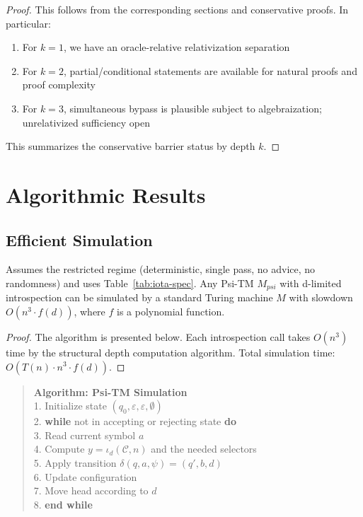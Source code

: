 \begin{proof}
This follows from the corresponding sections and conservative proofs. In particular:

\begin{enumerate}
\item For $k = 1$, we have an oracle-relative relativization separation
\item For $k = 2$, partial/conditional statements are available for natural proofs and proof complexity
\item For $k = 3$, simultaneous bypass is plausible subject to algebraization; unrelativized sufficiency open
\end{enumerate}

This summarizes the conservative barrier status by depth $k$.
\end{proof}

\section{Algorithmic Results}

\subsection{Efficient Simulation}

\begin{theorem}
Assumes the restricted regime (deterministic, single pass, no advice, no randomness) and uses Table~\ref{tab:iota-spec}.
Any Psi-TM $M_{psi}$ with d-limited introspection can be simulated by a standard Turing machine $M$ with slowdown $O(n^3 \cdot f(d))$, where $f$ is a polynomial function.
\end{theorem}

\begin{proof}
The algorithm is presented below. Each introspection call takes $O(n^3)$ time by the structural depth computation algorithm. Total simulation time: $O(T(n) \cdot n^3 \cdot f(d))$.
\end{proof}

\begin{quote}
\textbf{Algorithm: Psi-TM Simulation}\\[0.5em]
1. Initialize state $(q_0, \varepsilon, \varepsilon, \emptyset)$\\
2. \textbf{while} not in accepting or rejecting state \textbf{do}\\
3. \quad Read current symbol $a$\\
4. \quad Compute $y = \iota_d(\mathcal{C},n)$ and the needed selectors\\
5. \quad Apply transition $\delta(q, a, \psi) = (q', b, d)$\\
6. \quad Update configuration\\
7. \quad Move head according to $d$\\
8. \textbf{end while}
\end{quote}

